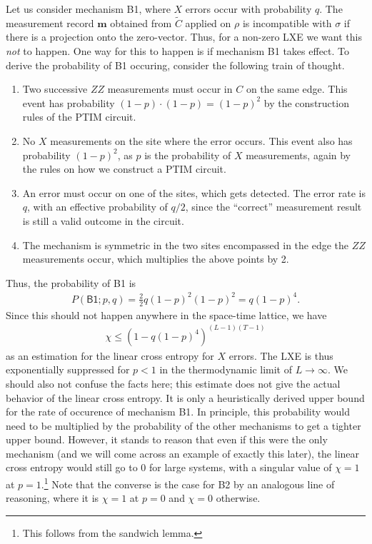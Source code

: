 Let us consider mechanism \textsf{B1}, where $X$ errors occur with probability
$q$.
The measurement record $\mathbf{m}$ obtained from $\tilde{C}$ applied on $\rho$
is incompatible with $\sigma$ if there is a projection onto the zero-vector.
Thus, for a non-zero LXE we want this \emph{not} to happen. One way for this to happen
is if mechanism \textsf{B1} takes effect. To derive the probability of
\textsf{B1} occuring, consider the following train of thought.

\begin{enumerate}
  \item Two successive $ZZ$ measurements must occur in $C$ on the same edge. This event has probability
    $(1-p)\cdot (1-p)= (1-p)^2$ by the construction rules of the PTIM circuit.
  \item No $X$ measurements on the site where the error occurs. This event also
    has probability $(1-p)^2$, as $p$ is the probability of $X$ measurements,
    again by the rules on how we construct a PTIM circuit.
  \item An error must occur on one of the sites, which gets detected. The error
    rate is $q$, with an effective probability of $q /2$, since the
    \enquote{correct} measurement result is still a valid outcome in the
    circuit.
  \item The mechanism is symmetric in the two sites encompassed in the edge the
    $ZZ$ measurements occur, which multiplies the above points by 2.
\end{enumerate}

Thus, the probability of \textsf{B1} is
\begin{align}
  P(\textsf{B1}; p,q) = \frac{2}{2} q \left(1-p\right)^2\left(1-p\right)^2 = q\left(
  1-p\right)^4
.\end{align}
Since this should not happen anywhere in the space-time lattice, we have
\begin{align}\label{eq:lxe-estimate}
      \chi \leq \left( 1-q\left( 1-p \right)^4  \right)^{(L-1)(T-1)}
\end{align}
as an estimation for the linear cross entropy for $X$ errors.
The LXE is thus exponentially suppressed for $p<1$ in the thermodynamic limit
of $L \to \infty$. We should also not confuse the facts here; this estimate
does not give the actual behavior of the linear cross entropy.  It is only a
heuristically derived upper bound for the rate of occurence of mechanism
\textsf{B1}. In principle, this probability would need to be multiplied by the
probability of the other mechanisms to get a tighter upper bound. However, it
stands to reason that even if this were the only mechanism (and we will come
across an example of exactly this later), the linear cross entropy would still
go to $0$ for large systems, with a singular value of $\chi=1$ at
$p=1$.\footnote{This follows from the sandwich lemma.} Note that the converse
is the case for \textsf{B2} by an analogous line of reasoning, where it is
$\chi=1$ at $p=0$ and $\chi=0$ otherwise. 

